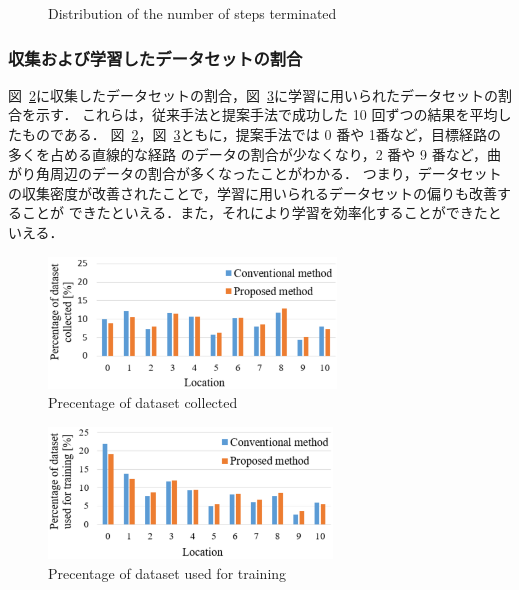 \documentclass{jarticle}
\renewcommand{\figurename}{図~}
\newcommand{\figref}[1]{\figurename\ref{#1}}
\begin{document}
\begin{figure}[htbp]
\begin{minipage}[t]{0.5\linewidth}
  \end{minipage}
  \caption{Distribution of the number of steps terminated}
   \label{fig:11}
\end{figure}


\subsubsection{収集および学習したデータセットの割合}
\figref{fig:12}に収集したデータセットの割合，\figref{fig:13}に学習に用いられたデータセットの割合を示す．
これらは，従来手法と提案手法で成功した 10 回ずつの結果を平均したものである．
\figref{fig:12}，\figref{fig:13}ともに，提案手法では 0 番や 1番など，目標経路の多くを占める直線的な経路
のデータの割合が少なくなり，2 番や 9 番など，曲がり角周辺のデータの割合が多くなったことがわかる．
つまり，データセットの収集密度が改善されたことで，学習に用いられるデータセットの偏りも改善することが
できたといえる．また，それにより学習を効率化することができたといえる．

\begin{figure}[h!]
  \centering
   \includegraphics[height=35mm]{./pdf/dataset_pro2.pdf}
   \caption{Precentage of dataset collected}
   \label{fig:12}
\end{figure}

\begin{figure}[h!]
  \centering
   \includegraphics[height=35mm]{./pdf/gaku_pro2.pdf}
   \caption{Precentage of dataset used for training}
   \label{fig:13}
\end{figure}
\end{document}
